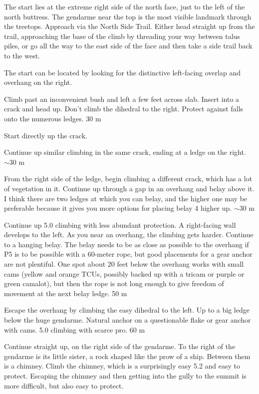 \documentclass{tahquitz}
\begin{document}
The start lies at  the extreme right side of the north face, just to
the left of the north buttress. The gendarme near the top is the most
visible landmark through the treetops. Approach via the North Side Trail.
Either head straight up from the trail, approaching the base of the climb by threading your
way between talus piles, or go all the way to the east side of the face
and then take a side trail back to the west.

The start can be located by looking for the distinctive left-facing
overlap and overhang on the right.

\somespace

 Climb past an inconvenient bush and left a few feet across slab.
Insert into a crack and head up. Don't climb the dihedral to the right. 
Protect against falls onto the numerous ledges.
30 m

 Start directly up the crack.

 Continue up similar climbing in the same crack,
ending at a ledge on the right.  $\sim 30$ m

 From the right side of the ledge, begin climbing a
different crack, which has a lot of vegetation in it.
Continue up through a gap in an overhang and belay above it.
I think there are two ledges at which you can belay, and the higher one
may be preferable because it gives you more options for placing belay
4 higher up. $\sim 30$ m

 Continue up 5.0 climbing with less abundant protection.  A
right-facing wall develops to the left.  As you near an overhang, the
climbing gets harder.  Continue to a hanging belay. The belay needs to
be as close as possible to the overhang if P5 is to be possible with a
60-meter rope, but good placements for a gear anchor are not
plentiful. One spot about 20 feet below the overhang works with small
cams (yellow and orange TCUs, possibly backed up with a tricam or
purple or green camalot), but then the rope is not long enough to give
freedom of movement at the next belay ledge. 50 m

 Escape the overhang by climbing the easy dihedral to the left.
Up to a big ledge below the huge gendarme. Natural anchor on a questionable
flake or gear anchor with cams. 5.0 climbing with scarce pro.
60 m

 Continue straight up, on the right side of the gendarme.  To
the right of the gendarme is its little sister, a rock shaped like the
prow of a ship. Between them is a chimney. Climb the chimney, which is
a surprisingly easy 5.2 and easy to protect. Escaping the chimney and
then getting into the gully to the summit is more difficult, but also
easy to protect.
\end{document}
